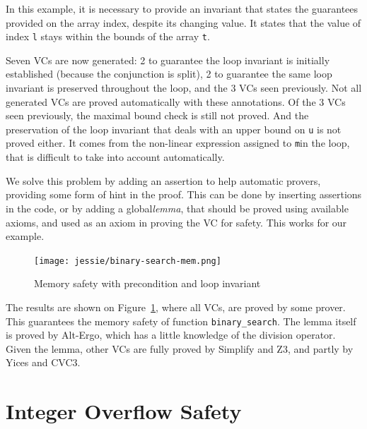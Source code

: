 \documentclass[a4paper,11pt,twoside,openright]{report}
\begin{document}
In this example, it is necessary to provide an invariant 
that states the guarantees provided on the array 
index, despite its changing value. It
states that the value of index \verb|l| stays within the bounds of the
array \verb|t|.



Seven VCs are now generated: 2 to guarantee the loop invariant is
initially established (because the conjunction is split), 2 to guarantee
the same loop invariant is preserved throughout the loop, and the 3 VCs
seen previously. Not all generated VCs are proved automatically with
these annotations. Of the 3 VCs seen previously, the maximal bound
check is still not proved. And the preservation of the loop invariant
that deals with an upper bound on \verb|u| is not proved either. It
comes from the non-linear expression assigned to \verb|m|in the loop,
that is difficult to take into account automatically. 

We solve this problem by adding an assertion to help automatic
provers, providing some form of hint in the proof. This can be done by
inserting assertions in the code, or by adding a global\emph{lemma}, that
should be proved using available axioms, and used as an axiom in
proving the VC for safety. This works for our example.



\begin{figure}[t]
  \begin{center}
    \texttt{[image: jessie/binary-search-mem.png]}
  \end{center}
  \caption{Memory safety with precondition and loop invariant}
  \label{fig:mem}
  \hrulefill
\end{figure}

The results are shown on Figure~\ref{fig:mem}, where all VCs, are
proved by some prover. This guarantees the memory safety of function
\verb|binary_search|. The lemma itself is proved by Alt-Ergo, which
has a little knowledge of the division operator. Given the lemma,
other VCs are fully proved by Simplify and Z3, and partly by Yices and
CVC3.



\section{Integer Overflow Safety}
\end{document}
